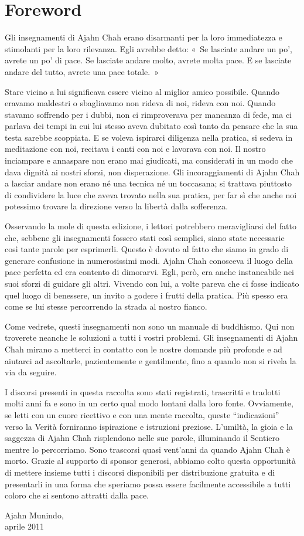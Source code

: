\chapter{Foreword}

Gli insegnamenti di Ajahn Chah erano disarmanti per la loro immediatezza
e stimolanti per la loro rilevanza. Egli avrebbe detto: «~Se lasciate
andare un po', avrete un po' di pace. Se lasciate andare molto, avrete
molta pace. E se lasciate andare del tutto, avrete una pace totale.~»

Stare vicino a lui significava essere vicino al miglior amico possibile.
Quando eravamo maldestri o sbagliavamo non rideva di noi, rideva con
noi. Quando stavamo soffrendo per i dubbi, non ci rimproverava per
mancanza di fede, ma ci parlava dei tempi in cui lui stesso aveva
dubitato così tanto da pensare che la sua testa sarebbe scoppiata. E se
voleva ispirarci diligenza nella pratica, si sedeva in meditazione con
noi, recitava i canti con noi e lavorava con noi. Il nostro inciampare e
annaspare non erano mai giudicati, ma considerati in un modo che dava
dignità ai nostri sforzi, non disperazione. Gli incoraggiamenti di Ajahn
Chah a lasciar andare non erano né una tecnica né un toccasana; si
trattava piuttosto di condividere la luce che aveva trovato nella sua
pratica, per far sì che anche noi potessimo trovare la direzione verso
la libertà dalla sofferenza.

Osservando la mole di questa edizione, i lettori potrebbero
meravigliarsi del fatto che, sebbene gli insegnamenti fossero stati così
semplici, siano state necessarie così tante parole per esprimerli.
Questo è dovuto al fatto che siamo in grado di generare confusione in
numerosissimi modi. Ajahn Chah conosceva il luogo della pace perfetta ed
era contento di dimorarvi. Egli, però, era anche instancabile nei suoi
sforzi di guidare gli altri. Vivendo con lui, a volte pareva che ci
fosse indicato quel luogo di benessere, un invito a godere i frutti
della pratica. Più spesso era come se lui stesse percorrendo la strada
al nostro fianco.

Come vedrete, questi insegnamenti non sono un manuale di buddhismo. Qui
non troverete neanche le soluzioni a tutti i vostri problemi. Gli
insegnamenti di Ajahn Chah mirano a metterci in contatto con le nostre
domande più profonde e ad aiutarci ad ascoltarle, pazientemente e
gentilmente, fino a quando non si rivela la via da seguire.

I discorsi presenti in questa raccolta sono stati registrati, trascritti
e tradotti molti anni fa e sono in un certo qual modo lontani dalla loro
fonte. Ovviamente, se letti con un cuore ricettivo e con una mente
raccolta, queste ``indicazioni'' verso la Verità forniranno ispirazione
e istruzioni preziose. L'umiltà, la gioia e la saggezza di Ajahn Chah
risplendono nelle sue parole, illuminando il Sentiero mentre lo
percorriamo. Sono trascorsi quasi vent'anni da quando Ajahn Chah è
morto. Grazie al supporto di sponsor generosi, abbiamo colto questa
opportunità di mettere insieme tutti i discorsi disponibili per
distribuzione gratuita e di presentarli in una forma che speriamo possa
essere facilmente accessibile a tutti coloro che si sentono attratti
dalla pace.

\bigskip

{\raggedleft
  Ajahn Munindo,\\
  aprile 2011
\par}

